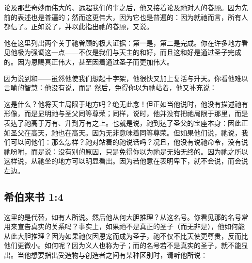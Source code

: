  论及那些奇妙而伟大的、远超我们的事之后，他又接着论及祂对人的眷顾。因为先前的表述也是普遍的；然而这更伟大，因为它也是普遍的：因为就祂而言，所有人都信了。正如说了，并以此指出祂的眷顾，又说。\par

 他在这里列出两个关于祂眷顾的极大证据：第一是，第二是完成。你在许多地方看见他极为强调这一点——不仅是我们与天主的和好，而且这和好是通过圣子完成的。因为恩赐真正伟大，甚至因着通过圣子而更加伟大。\par

因为说到和——虽然他使我们想起十字架，他很快又加上复活与升天。你看他难以言喻的智慧：他没有说，而是 然后，免得你以为祂站着，他又补充说：\par

 这是什么？他将天主局限于地方吗？绝无此念！但正如当他说时，他没有描述祂有形像，而是显明祂与圣父同等尊荣；同样，说时，他并没有把祂局限于那里，而是表达了祂高于万有、升到万有之上。也就是说，祂到达了圣父的宝座本身：因此正如圣父在高天，祂也在高天。因为无非意味着同等尊荣。但如果他们说，祂说，我们可以问他们：那么怎样？祂对站着的祂说话吗？况且，他没有说祂命令，没有说祂吩咐，而是说：没有别的原因，只是免得你以为祂是无始无终的。因为祂之所以这样说，从祂坐的地方可以明显看出。因为若他意在表明卑下，就不会说，而会说左边。\par


\subsection{希伯来书 1:4}

 这里的是代替，如有人所说。然后他从何大胆推理？从这名号。你看见那的名号常用来宣告真实的关系吗？事实上，如果祂不是真正的圣子（而无非是），他如何能从此大胆推理？因为如果祂仅因恩宠而成为圣子，祂不仅不比天使更尊贵，反而比他们更微小。如何呢？因为义人也称为子；而的名号若不是真实的圣子，就不能显出。当他想要指出受造物与创造者之间有某种区别时，请听他所说：\par

